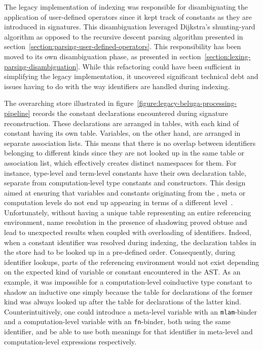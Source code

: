 

The legacy implementation of indexing was responsible for disambiguating the application of user-defined operators since it kept track of constants as they are introduced in \Beluga signatures.
This disambiguation leveraged Dijkstra's shunting-yard algorithm as opposed to the recursive descent parsing algorithm presented in section~\ref{section:parsing-user-defined-operators}.
This responsibility has been moved to its own disambiguation phase, as presented in section~\ref{section:lexing-parsing-disambiguation}.
While this refactoring could have been sufficient in simplifying the legacy implementation, it uncovered significant technical debt and issues having to do with the way identifiers are handled during indexing.

The overarching store illustrated in figure~\ref{figure:legacy-beluga-processing-pipeline} records the constant declarations encountered during signature reconstruction.
These declarations are arranged in tables, with each kind of constant having its own table.
Variables, on the other hand, are arranged in separate association lists.
This means that there is no overlap between identifiers belonging to different kinds since they are not looked up in the same table or association list, which effectively creates distinct namespaces for them.
For instance, \LF type-level and term-level constants have their own declaration table, separate from computation-level type constants and constructors.
This design aimed at ensuring that variables and constants originating from the \LF, meta or computation levels do not end up appearing in terms of a different level~\cite{germain2010implementation}.
Unfortunately, without having a unique table representing an entire referencing environment, name resolution in the presence of shadowing proved obtuse and lead to unexpected results when coupled with overloading of identifiers.
Indeed, when a constant identifier was resolved during indexing, the declaration tables in the store had to be looked up in a pre-defined order.
Consequently, during identifier lookups, parts of the referencing environment would not exist depending on the expected kind of variable or constant encountered in the \ac{AST}.
As an example, it was impossible for a computation-level coinductive type constant to shadow an inductive one simply because the table for declarations of the former kind was always looked up after the table for declarations of the latter kind.
Counterintuitively, one could introduce a meta-level variable with an \verb|mlam|-binder and a computation-level variable with an \verb|fn|-binder, both using the same identifier, and be able to use both meanings for that identifier in meta-level and computation-level expressions respectively.

